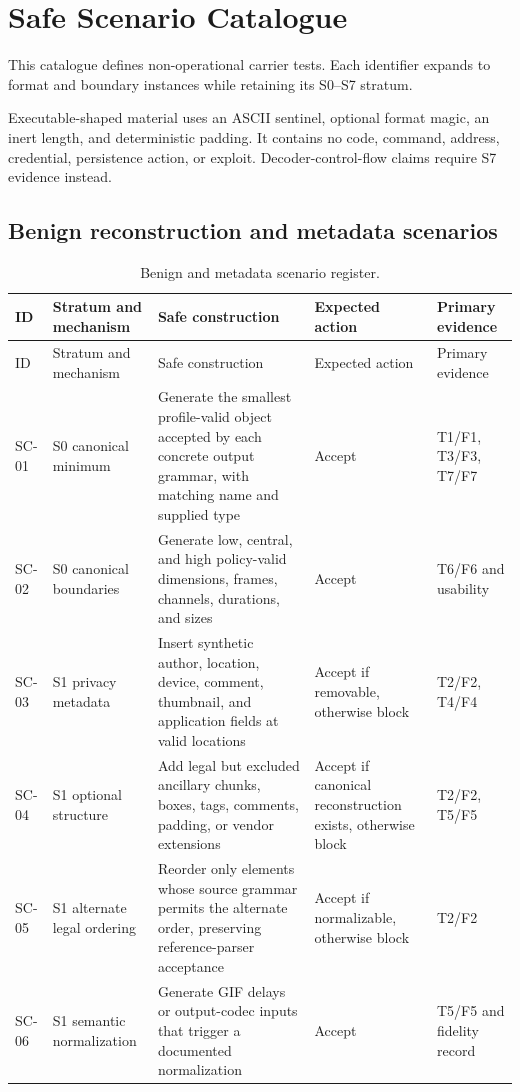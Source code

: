 \section{Safe Scenario Catalogue}
\label{app:scenario-catalogue}

This catalogue defines non-operational carrier tests. Each identifier expands
to format and boundary instances while retaining its S0--S7 stratum.

Executable-shaped material uses an ASCII sentinel, optional format magic, an
inert length, and deterministic padding. It contains no code, command, address,
credential, persistence action, or exploit. Decoder-control-flow claims require
S7 evidence instead.

\subsection{Benign reconstruction and metadata scenarios}
\label{subsec:scenario-benign}

\begingroup
\scriptsize
\setlength{\tabcolsep}{2.5pt}
\begin{longtable}{L{0.08\textwidth}L{0.16\textwidth}L{0.34\textwidth}L{0.11\textwidth}L{0.13\textwidth}}
\caption{Benign and metadata scenario register.}
\label{tab:scenario-benign}\\
\toprule
ID & Stratum and mechanism & Safe construction & Expected action & Primary evidence \\
\midrule
\endfirsthead
\toprule
ID & Stratum and mechanism & Safe construction & Expected action & Primary evidence \\
\midrule
\endhead
SC-01 & S0 canonical minimum & Generate the smallest profile-valid object accepted by each concrete output grammar, with matching name and supplied type & Accept & T1/F1, T3/F3, T7/F7 \\
SC-02 & S0 canonical boundaries & Generate low, central, and high policy-valid dimensions, frames, channels, durations, and sizes & Accept & T6/F6 and usability \\
SC-03 & S1 privacy metadata & Insert synthetic author, location, device, comment, thumbnail, and application fields at valid locations & Accept if removable, otherwise block & T2/F2, T4/F4 \\
SC-04 & S1 optional structure & Add legal but excluded ancillary chunks, boxes, tags, comments, padding, or vendor extensions & Accept if canonical reconstruction exists, otherwise block & T2/F2, T5/F5 \\
SC-05 & S1 alternate legal ordering & Reorder only elements whose source grammar permits the alternate order, preserving reference-parser acceptance & Accept if normalizable, otherwise block & T2/F2 \\
SC-06 & S1 semantic normalization & Generate GIF delays or output-codec inputs that trigger a documented normalization & Accept & T5/F5 and fidelity record \\
\bottomrule
\end{longtable}
\endgroup

